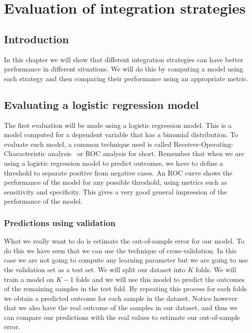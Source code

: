 \chapter{Evaluation of integration strategies}
\label{cha:evaluation}


\section{Introduction}
\label{sec:evaluation-introduction}
In this chapter we will show that different integration strategies can have better performance in different situations. We will do this by computing a model using each strategy and then comparing their performance using an appropriate metric.
\section{Evaluating a logistic regression model}
\label{sec:evaluation-logisticregression}
The first evaluation will be made using a logistic regression model. This is a model computed for a dependent variable that has a binomial distribution. To evaluate such model, a common technique used is called Receiver-Operating-Characteristic analysis~\cite{zweig1993receiver}\cite{hajian2013receiver}\cite{wikiroc} or ROC analysis for short. Remember that when we are using a logistic regression model to predict outcomes, we have to define a threshold to separate positive from negative cases. An ROC curve shows the performance of the model for any possible threshold, using metrics such as sensitivity and specificity. This gives a very good general impression of the performance of the model.
\subsection{Predictions using validation}
What we really want to do is estimate the out-of-sample error for our model. To do this we have seen that we can use the technique of cross-validation. In this case we are not going to compute any learning parameter but we are going to use the validation set as a test set. We will split our dataset into $K$ folds. We will train a model on $K-1$ folds and we will use this model to predict the outcomes of the remaining samples in the test fold. By repeating this process for each folds we obtain a predicted outcome for each sample in the dataset. Notice however that we also have the real outcome of the samples in our dataset, and thus we can compare our predictions with the real values to estimate our out-of-sample error.
